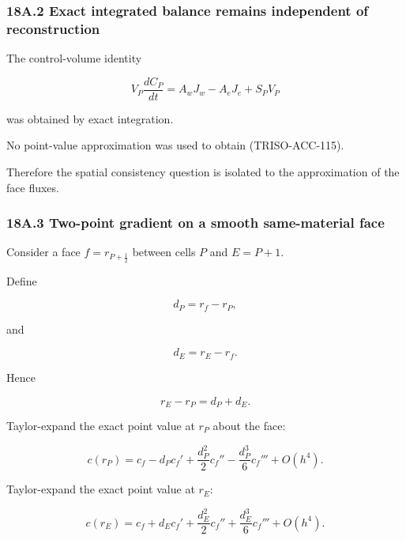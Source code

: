 \documentclass[11pt,a4paper]{article}
\begin{document}
\subsubsection*{18A.2 Exact integrated balance remains independent of reconstruction}

The control-volume identity

\begin{equation}
V_P\frac{dC_P}{dt}
=
A_wJ_w-A_eJ_e+S_PV_P
\tag{TRISO-ACC-115}
\label{eq:triso-acc-115}
\end{equation}

was obtained by exact integration.

No point-value approximation was used to obtain (TRISO-ACC-115).

Therefore the spatial consistency question is isolated to the approximation of the face fluxes.

\subsubsection*{18A.3 Two-point gradient on a smooth same-material face}

Consider a face $f=r_{P+\frac12}$ between cells $P$ and $E=P+1$.

Define

\begin{equation}
d_P=r_f-r_P,
\tag{TRISO-ACC-116}
\label{eq:triso-acc-116}
\end{equation}

and

\begin{equation}
d_E=r_E-r_f.
\tag{TRISO-ACC-117}
\label{eq:triso-acc-117}
\end{equation}

Hence

\begin{equation}
r_E-r_P=d_P+d_E.
\tag{TRISO-ACC-118}
\label{eq:triso-acc-118}
\end{equation}

Taylor-expand the exact point value at $r_P$ about the face:

\begin{equation}
c(r_P)
=
c_f
-
d_Pc_f'
+
\frac{d_P^2}{2}c_f''
-
\frac{d_P^3}{6}c_f'''
+
O(h^4).
\tag{TRISO-ACC-119}
\label{eq:triso-acc-119}
\end{equation}

Taylor-expand the exact point value at $r_E$:

\begin{equation}
c(r_E)
=
c_f
+
d_Ec_f'
+
\frac{d_E^2}{2}c_f''
+
\frac{d_E^3}{6}c_f'''
+
O(h^4).
\tag{TRISO-ACC-120}
\label{eq:triso-acc-120}
\end{equation}
\end{document}
